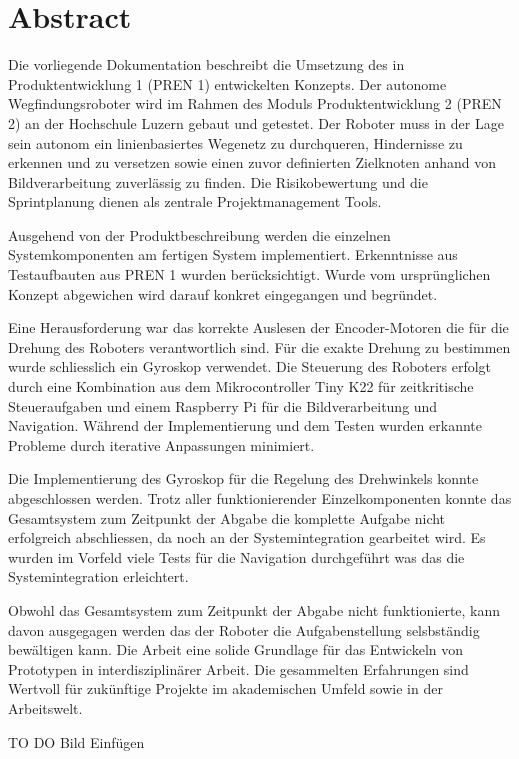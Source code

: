 \section*{Abstract}


Die vorliegende Dokumentation beschreibt die Umsetzung des in Produktentwicklung 1 (PREN 1) entwickelten Konzepts. Der autonome Wegfindungsroboter wird im Rahmen des Moduls Produktentwicklung 2 (PREN 2) an der Hochschule Luzern gebaut und getestet. Der Roboter muss in der Lage sein autonom ein linienbasiertes Wegenetz zu durchqueren, Hindernisse zu erkennen und zu versetzen sowie einen zuvor definierten Zielknoten anhand von Bildverarbeitung zuverlässig zu finden. Die Risikobewertung und die Sprintplanung dienen als zentrale Projektmanagement Tools.  

Ausgehend von der Produktbeschreibung werden die einzelnen Systemkomponenten am fertigen System implementiert. Erkenntnisse aus Testaufbauten aus PREN 1 wurden berücksichtigt. Wurde vom ursprünglichen Konzept abgewichen wird darauf konkret eingegangen und begründet. 

Eine Herausforderung war das korrekte Auslesen der Encoder-Motoren die für die Drehung des Roboters verantwortlich sind. Für die exakte Drehung zu bestimmen wurde schliesslich ein Gyroskop verwendet. Die Steuerung des Roboters erfolgt durch eine Kombination aus dem Mikrocontroller Tiny K22 für zeitkritische Steueraufgaben und einem Raspberry Pi für die Bildverarbeitung und Navigation. Während der Implementierung und dem Testen wurden erkannte Probleme durch iterative Anpassungen minimiert.


Die Implementierung des Gyroskop für die Regelung des Drehwinkels konnte abgeschlossen werden. Trotz aller funktionierender Einzelkomponenten konnte das Gesamtsystem zum Zeitpunkt der Abgabe die komplette Aufgabe nicht erfolgreich abschliessen, da noch an der Systemintegration gearbeitet wird. Es wurden im Vorfeld viele Tests für die Navigation durchgeführt was das die Systemintegration erleichtert.

Obwohl das Gesamtsystem zum Zeitpunkt der Abgabe nicht funktionierte, kann davon ausgegagen werden das der Roboter die Aufgabenstellung selsbständig bewältigen kann. Die Arbeit eine solide Grundlage für das Entwickeln von Prototypen in interdisziplinärer Arbeit. Die gesammelten Erfahrungen sind Wertvoll für zukünftige Projekte im akademischen Umfeld sowie in der Arbeitswelt.


TO DO Bild Einfügen
